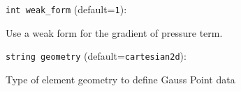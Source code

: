 \item\verb+int weak_form+ {\rm(default=\verb|1|)}:

Use a weak form for the gradient of pressure term. 
\item\verb+string geometry+ {\rm(default=\verb|cartesian2d|)}:

Type of element geometry to define Gauss Point data
